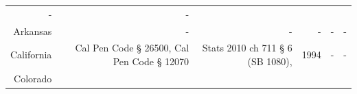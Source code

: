 \documentclass[]{article}
\begin{document}
\begin{longtable}[c]{@{}rrrrrr@{}}
\begin{minipage}[t]{0.10\columnwidth}\raggedleft\strut
-
\strut\end{minipage} &
\begin{minipage}[t]{0.10\columnwidth}\raggedleft\strut
-
\strut\end{minipage}\tabularnewline
\begin{minipage}[t]{0.10\columnwidth}\raggedleft\strut
Arkansas
\strut\end{minipage} &
\begin{minipage}[t]{0.21\columnwidth}\raggedleft\strut
-
\strut\end{minipage} &
\begin{minipage}[t]{0.22\columnwidth}\raggedleft\strut
-
\strut\end{minipage} &
\begin{minipage}[t]{0.10\columnwidth}\raggedleft\strut
-
\strut\end{minipage} &
\begin{minipage}[t]{0.10\columnwidth}\raggedleft\strut
-
\strut\end{minipage} &
\begin{minipage}[t]{0.10\columnwidth}\raggedleft\strut
-
\strut\end{minipage}\tabularnewline
\begin{minipage}[t]{0.10\columnwidth}\raggedleft\strut
California
\strut\end{minipage} &
\begin{minipage}[t]{0.21\columnwidth}\raggedleft\strut
Cal Pen Code § 26500, Cal Pen Code § 12070
\strut\end{minipage} &
\begin{minipage}[t]{0.22\columnwidth}\raggedleft\strut
Stats 2010 ch 711 § 6 (SB 1080),
\strut\end{minipage} &
\begin{minipage}[t]{0.10\columnwidth}\raggedleft\strut
1994
\strut\end{minipage} &
\begin{minipage}[t]{0.10\columnwidth}\raggedleft\strut
-
\strut\end{minipage} &
\begin{minipage}[t]{0.10\columnwidth}\raggedleft\strut
-
\strut\end{minipage}\tabularnewline
\begin{minipage}[t]{0.10\columnwidth}\raggedleft\strut
Colorado
\strut\end{minipage} &
\begin{minipage}[t]{0.21\columnwidth}\raggedleft\strut

\end{minipage}
\end{longtable}
\end{document}
